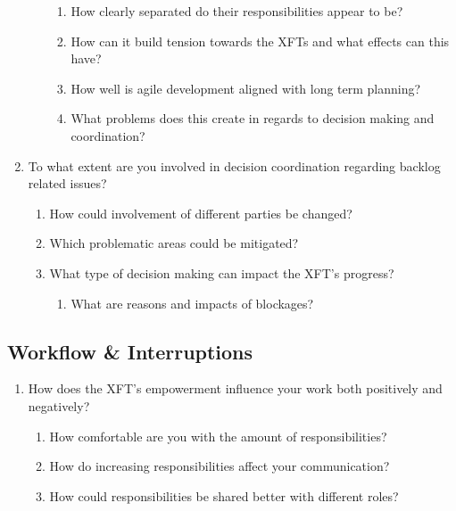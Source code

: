 \begin{enumerate}
\begin{enumerate}
      \begin{enumerate}
      \item How clearly separated do their responsibilities appear to be?
      \item How can it build tension towards the XFTs and what effects can this have?
      \item How well is agile development aligned with long term planning?
      \item What problems does this create in regards to decision making and coordination?
     \end{enumerate}
  \end{enumerate}

  \item To what extent are you involved in decision coordination regarding backlog related issues?
    
    \begin{enumerate}
      \item How could involvement of different parties be changed?
      \item Which problematic areas could be mitigated?
      \item What type of decision making can impact the XFT’s progress?
      
        \begin{enumerate}
        \item What are reasons and impacts of blockages?
        \end{enumerate}
    \end{enumerate}
\end{enumerate}

\subsection*{Workflow \& Interruptions}

\begin{enumerate}
  \item How does the XFT's empowerment influence your work both positively and negatively?
  
   \begin{enumerate}
         \item How comfortable are you with the amount of responsibilities?
         \item How do increasing responsibilities affect your communication?
         \item How could responsibilities be shared better with different roles?
   \end{enumerate}
\end{enumerate}
